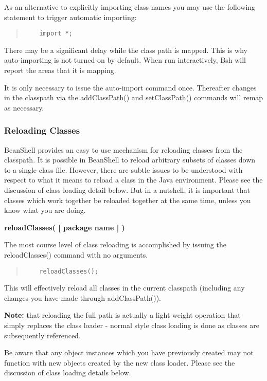 \documentclass[twoside,11pt]{article}
\renewcommand{\_}{\texttt{\symbol{95}}}
\begin{document}
As an alternative to explicitly importing class names you may use the
following statement to trigger automatic importing:
\begin{quote}
\begin{verbatim}
    import *;
\end{verbatim}
\end{quote}

There may be a significant delay while the class path is mapped.  This
is why auto-importing is not turned on by default.  When run
interactively, Bsh will report the areas that it is mapping.

It is only necessary to issue the auto-import command once.
Thereafter changes in the classpath via the addClassPath() and
setClassPath() commands will remap as necessary.

\subsubsection{Reloading Classes}

BeanShell provides an easy to use mechanism for reloading classes from
the classpath.  It is possible in BeanShell to reload arbitrary
subsets of classes down to a single class file.  However, there are
subtle issues to be understood with respect to what it means to reload
a class in the Java environment.  Please see the discussion of class
loading detail below.  But in a nutshell, it is important that classes
which work together be reloaded together at the same time, unless you
know what you are doing.

\textbf{reloadClasses( [ package name ] )}

The most course level of class reloading is accomplished by issuing
the reloadClasses() command with no arguments.
\begin{quote}
\begin{verbatim}
    reloadClasses();
\end{verbatim}
\end{quote}

This will effectively reload all classes in the current classpath
(including any changes you have made through addClassPath()).

\textbf{Note:} that reloading the full path is actually a light weight operation that
simply replaces the class loader - normal style class loading is done
as classes are subsequently referenced.

Be aware that any object instances which you have previously created
may not function with new objects created by the new class loader.
Please see the discussion of class loading details below.
\end{document}
